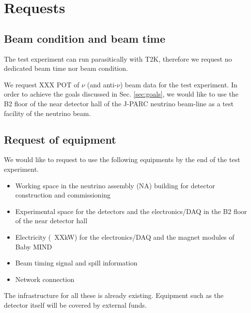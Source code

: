 \section{Requests}
\subsection{Beam condition and beam time}
The test experiment can run parasitically with T2K,
therefore we request no dedicated beam time nor beam condition.


We request XXX POT of $\nu$ (and anti-$\nu$) beam data for the test experiment.
In order to achieve the goals discussed in Sec. \ref{sec:goals}, we would like to use the B2 floor of the near detector hall of the J-PARC neutrino beam-line as a test facility of the neutrino beam.

\subsection{Request of equipment}
We would like to request to use the following equipments by the end of the test experiment.
\begin{itemize}
\item Working space in the neutrino assembly (NA) building for detector construction and commissioning
\item Experimental space for the detectors and the electronics/DAQ in the B2 floor of the near detector hall
\item Electricity (~XXkW) for the electronics/DAQ and the magnet modules of Baby MIND
\item Beam timing signal and spill information
\item Network connection
\end{itemize}
The infrastructure for all these is already existing.
Equipment such as the detector itself will be covered by external funds.